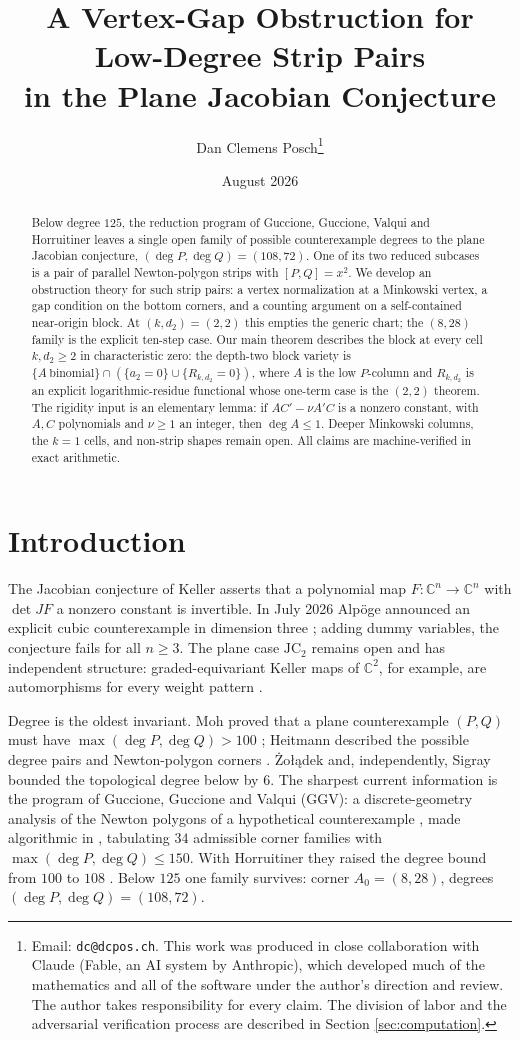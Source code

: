 \documentclass[11pt]{article}
\title{A Vertex-Gap Obstruction for Low-Degree Strip Pairs\\ in the Plane Jacobian Conjecture}
\author{Dan Clemens Posch\thanks{Email: \texttt{dc@dcpos.ch}. This work was produced in close collaboration with Claude (Fable, an AI system by Anthropic), which developed much of the mathematics and all of the software under the author's direction and review. The author takes responsibility for every claim. The division of labor and the adversarial verification process are described in Section \ref{sec:computation}.}}
\date{August 2026}
\theoremstyle{definition}
\theoremstyle{remark}
\begin{document}
\maketitle

\begin{abstract}
Below degree $125$, the reduction program of Guccione, Guccione, Valqui and Horruitiner leaves a single open family of possible counterexample degrees to the plane Jacobian conjecture, $(\deg P,\deg Q)=(108,72)$. One of its two reduced subcases is a pair of parallel Newton-polygon strips with $[P,Q]=x^2$. We develop an obstruction theory for such strip pairs: a vertex normalization at a Minkowski vertex, a gap condition on the bottom corners, and a counting argument on a self-contained near-origin block. At $(k,d_2)=(2,2)$ this empties the generic chart; the $(8,28)$ family is the explicit ten-step case. Our main theorem describes the block at every cell $k,d_2\geq 2$ in characteristic zero: the depth-two block variety is $\{A\ \text{binomial}\}\cap(\{a_2=0\}\cup\{R_{k,d_2}=0\})$, where $A$ is the low $P$-column and $R_{k,d_2}$ is an explicit logarithmic-residue functional whose one-term case is the $(2,2)$ theorem. The rigidity input is an elementary lemma: if $AC'-\nu A'C$ is a nonzero constant, with $A,C$ polynomials and $\nu\geq1$ an integer, then $\deg A\leq 1$. Deeper Minkowski columns, the $k=1$ cells, and non-strip shapes remain open. All claims are machine-verified in exact arithmetic.
\end{abstract}

\section{Introduction}\label{sec:intro}

The Jacobian conjecture of Keller asserts that a polynomial map $F\colon \mathbb{C}^n\to\mathbb{C}^n$ with $\det JF$ a nonzero constant is invertible. In July 2026 Alp\"oge announced an explicit cubic counterexample in dimension three \cite{Alpoge}; adding dummy variables, the conjecture fails for all $n\geq 3$. The plane case $\mathrm{JC}_2$ remains open and has independent structure: graded-equivariant Keller maps of $\mathbb{C}^2$, for example, are automorphisms for every weight pattern \cite{Shaska}.

Degree is the oldest invariant. Moh proved that a plane counterexample $(P,Q)$ must have $\max(\deg P,\deg Q)>100$ \cite{Moh}; Heitmann described the possible degree pairs and Newton-polygon corners \cite{Heitmann}. \.Zo{\l}\k{a}dek \cite{Zoladek} and, independently, Sigray \cite{Sigray} bounded the topological degree below by $6$. The sharpest current information is the program of Guccione, Guccione and Valqui (GGV): a discrete-geometry analysis of the Newton polygons of a hypothetical counterexample \cite{GGV1,GGV2,GGV3}, made algorithmic in \cite{GGV4}, tabulating $34$ admissible corner families with $\max(\deg P,\deg Q)\leq 150$. With Horruitiner they raised the degree bound from $100$ to $108$ \cite{GGHV}. Below $125$ one family survives: corner $A_0=(8,28)$, degrees $(\deg P,\deg Q)=(108,72)$.
\end{document}
